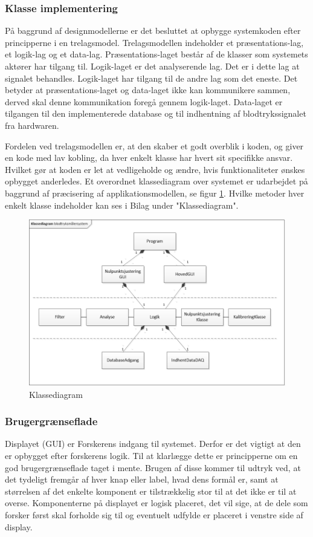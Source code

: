 \subsubsection{Klasse implementering}
På baggrund af designmodellerne er det besluttet at opbygge systemkoden efter principperne i en trelagsmodel\cite{3lagsmodel}. Trelagsmodellen indeholder et præsentations-lag, et logik-lag og et data-lag. Præsentations-laget består af de klasser som systemets aktører har tilgang til. Logik-laget er det analyserende lag. Det er i dette lag at signalet behandles. Logik-laget har tilgang til de andre lag som det eneste. Det betyder at præsentations-laget og data-laget ikke kan kommunikere sammen, derved skal denne kommunikation foregå gennem logik-laget. Data-laget er tilgangen til den implementerede database og til indhentning af blodtrykssignalet fra hardwaren.

Fordelen ved trelagsmodellen er, at den skaber et godt overblik i koden, og giver en kode med lav kobling, da hver enkelt klasse har hvert sit specifikke ansvar. Hvilket gør at koden er let at vedligeholde og ændre, hvis funktionaliteter ønskes opbygget anderledes. Et overordnet klassediagram over systemet er udarbejdet på baggrund af præcisering af applikationsmodellen, se figur \ref{fig:KlassediagramSW}. Hvilke metoder hver enkelt klasse indeholder kan ses i Bilag under "Klassediagram". 
\begin{figure}[H]
	\centering
	\includegraphics[width=1.0\textwidth]{Figurer/Klassediagram}
	\caption{Klassediagram}
	\label{fig:KlassediagramSW}
\end{figure}

\subsubsection{Brugergrænseflade}
Displayet (GUI) er Forskerens indgang til systemet. Derfor er det vigtigt at den er opbygget efter forskerens logik. Til at klarlægge dette er principperne om en god brugergrænseflade taget i mente. Brugen af disse kommer til udtryk ved, at det tydeligt fremgår af hver knap eller label, hvad dens formål er, samt at størrelsen af det enkelte komponent er tilstrækkelig stor til at det ikke er til at overse. Komponenterne på displayet er logisk placeret, det vil sige, at de dele som forsker først skal forholde sig til og eventuelt udfylde er placeret i venstre side af display. 

